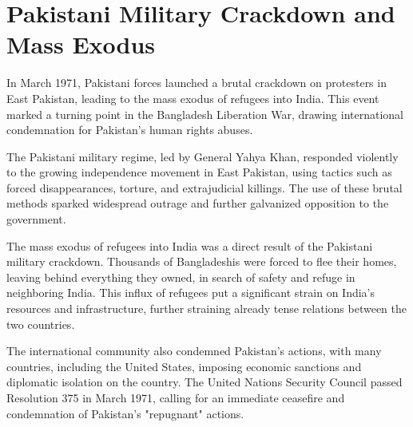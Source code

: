 \pagestyle{empty}



\section{Pakistani Military Crackdown and Mass Exodus}

In March 1971, Pakistani forces launched a brutal crackdown on protesters in East Pakistan, leading to the mass exodus of refugees into India. This event marked a turning point in the Bangladesh Liberation War, drawing international condemnation for Pakistan's human rights abuses.

The Pakistani military regime, led by General Yahya Khan, responded violently to the growing independence movement in East Pakistan, using tactics such as forced disappearances, torture, and extrajudicial killings. The use of these brutal methods sparked widespread outrage and further galvanized opposition to the government.

The mass exodus of refugees into India was a direct result of the Pakistani military crackdown. Thousands of Bangladeshis were forced to flee their homes, leaving behind everything they owned, in search of safety and refuge in neighboring India. This influx of refugees put a significant strain on India's resources and infrastructure, further straining already tense relations between the two countries.

The international community also condemned Pakistan's actions, with many countries, including the United States, imposing economic sanctions and diplomatic isolation on the country. The United Nations Security Council passed Resolution 375 in March 1971, calling for an immediate ceasefire and condemnation of Pakistan's "repugnant" actions.

